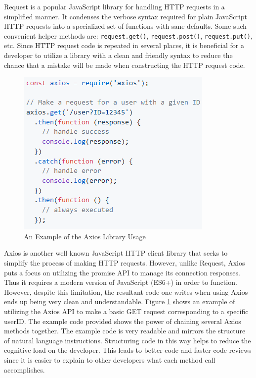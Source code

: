 \documentclass[12pt]{report}
\begin{document}
\begin{enumerate}
Request is a popular JavaScript library for handling HTTP requests in a simplified manner. It condenses the verbose syntax required for plain JavaScript HTTP requests into a specialized set of functions with sane defaults. Some such convenient helper methods are: \texttt{request.get()}, \texttt{request.post()}, \texttt{request.put()}, etc. Since HTTP request code is repeated in several places, it is beneficial for a developer to utilize a library with a clean and friendly syntax to reduce the chance that a mistake will be made when constructing the HTTP request code.

\begin{figure}[h]
	\centering
	\includegraphics[scale=0.5]{axios_example}
	\caption{An Example of the Axios Library Usage}
	\label{fig:axiosexample}
\end{figure}

Axios is another well known JavaScript HTTP client library that seeks to simplify the process of making HTTP requests. However, unlike Request, Axios puts a focus on utilizing the promise API to manage its connection responses. Thus it requires a modern version of JavaScript (ES6+) in order to function. However, despite this limitation, the resultant code one writes when using Axios ends up being very clean and understandable. Figure \ref{fig:axiosexample} shows an example of utilizing the Axios API to make a basic GET request corresponding to a specific userID.\cite{axiosgithub} The example code provided shows the power of chaining several Axios methods together. The example code is very readable and mirrors the structure of natural language instructions. Structuring code in this way helps to reduce the cognitive load on the developer. This leads to better code and faster code reviews since it is easier to explain to other developers what each method call accomplishes.


\end{enumerate}
\end{document}
